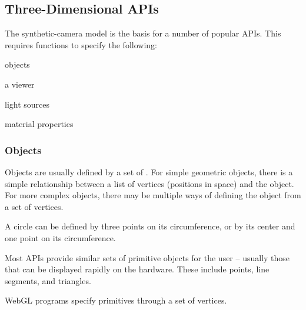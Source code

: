 \documentclass[../COS3712_Notes.tex]{subfiles}
\begin{document}
      \subsection{Three-Dimensional APIs}
        The synthetic-camera model is the basis for a number of popular APIs.
        This requires functions to specify the following:
        \begin{center}
          \begin{itemize*}[itemjoin=\quad]
            \item objects
            \item a viewer
            \item light sources
            \item material properties
          \end{itemize*}
        \end{center}

        \subsubsection{Objects}
          Objects are usually defined by a set of .
          For simple geometric objects, there is a simple relationship between a list of vertices
          (positions in space)
          and the object.
          For more complex objects, there may be multiple ways of defining the object
          from a set of vertices.

          \begin{example}[Circle]
            A circle can be defined by three points on its circumference,
            or by its center and one point on its circumference.
          \end{example}

          Most APIs provide similar sets of primitive objects for the user
          -- usually those that can be displayed rapidly on the hardware.
          These include points, line segments, and triangles.

          WebGL programs specify primitives through a set of vertices.
\end{document}
